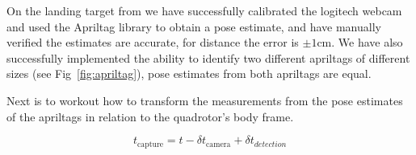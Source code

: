 \documentclass[11pt, twocolumn]{article}
\begin{document}
On the landing target from we have successfully calibrated the logitech webcam and used the Apriltag library to obtain a pose estimate, and have manually verified the estimates are accurate, for distance the error is $\pm 1$cm. We have also successfully implemented the ability to identify two different apriltags of different sizes (see Fig~\ref{fig:apriltag}), pose estimates from both apriltags are equal.

Next is to workout how to transform the measurements from the pose estimates of the apriltags in relation to the quadrotor's body frame.




\begin{equation}
    t_{\text{capture}} = t - \delta t_{\text{camera}} + \delta t_{detection}
\end{equation}




{}

\end{document}

